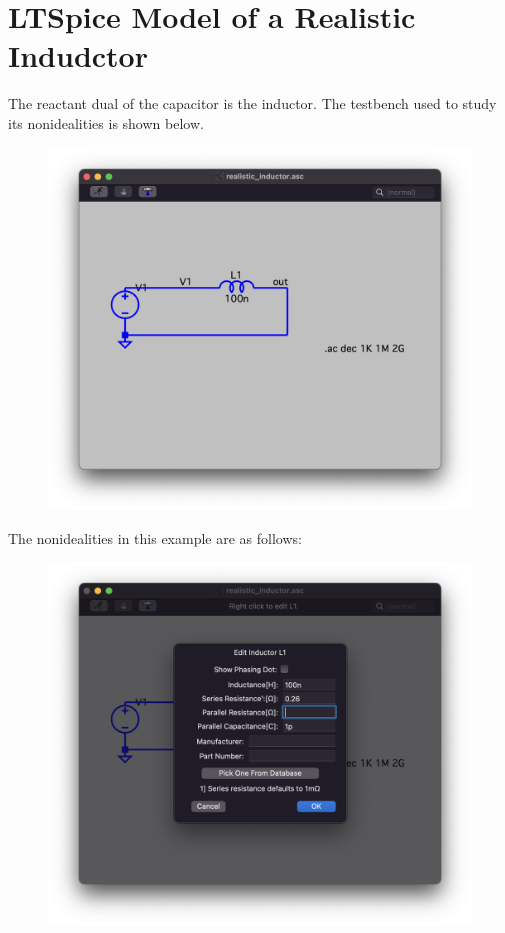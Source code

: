 \documentclass{article}
\begin{document}
\section*{LTSpice Model of a Realistic Indudctor}
The reactant dual of the capacitor is the inductor. The testbench used to study its nonidealities is shown below.
\begin{figure}[H]
    \includegraphics[width=\textwidth]{images/realistic_inductor_setup.png}
\end{figure}
The nonidealities in this example are as follows:
\begin{figure}[H]
    \includegraphics[width=\textwidth]{images/realistic_inductor_setup_parasitics.png}
\end{figure}
\end{document}

